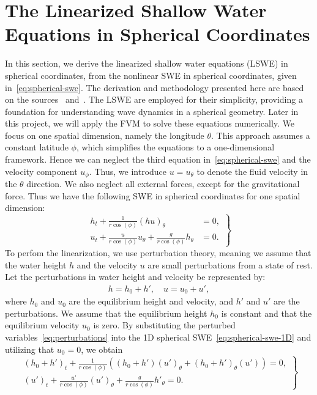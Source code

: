 \section{The Linearized Shallow Water Equations in Spherical Coordinates}
In this section, we derive the linearized shallow water equations (LSWE) in spherical coordinates, from the nonlinear SWE in spherical coordinates, given in~\eqref{eq:spherical-swe}.
The derivation and methodology presented here are based on the sources~\cite{BONEV_2018} and~\cite{Eskilsson_2005}.
The LSWE are employed for their simplicity, providing a foundation for understanding wave dynamics in a spherical geometry.
Later in this project, we will apply the FVM to solve these equations numerically.
We focus on one spatial dimension, namely the longitude $\theta$. 
This approach assumes a constant latitude $\phi$, which simplifies the equations to a one-dimensional framework.
Hence we can neglect the third equation in~\eqref{eq:spherical-swe} and the velocity component $u_\phi$.
Thus, we introduce $u = u_\theta$ to denote the fluid velocity in the $\theta$ direction.
We also neglect all external forces, except for the gravitational force.
Thus we have the following SWE in spherical coordinates for one spatial dimension:
\begin{equation}\label{eq:spherical-swe-1D}
    \left.
    \begin{aligned}
        h_t + \frac{1}{r \cos (\phi)}  {(h u)}_{\theta}  &= 0, \\
        {u}_t  + \frac{u}{r \cos (\phi)} {u}_\theta + \frac{g}{r \cos (\phi)} h_\theta  &= 0.
    \end{aligned}
    \right\}
\end{equation}
To perfom the linearization, we use perturbation theory, meaning we assume that the water height $h$ and the velocity $u$ are small perturbations from a state of rest.
Let the perturbations in water height and velocity be represented by:
\begin{align}\label{eq:perturbations}
    h = h_0 + h', \quad u = u_0 + u',
\end{align}
where $h_0$ and $u_0$ are the equilibrium height and velocity, and $h'$ and $u'$ are the perturbations.
We assume that the equilibrium height $h_0$ is constant and that the equilibrium velocity $u_0$ is zero.
By substituting the perturbed variables~\eqref{eq:perturbations} into the 1D spherical SWE~\eqref{eq:spherical-swe-1D} and utilizing that $u_0 = 0$, we obtain
\begin{equation}\label{eq:linearized_swe_spherical-perturbations}
    \left.
    \begin{aligned}
        {(h_0 + h')}_t + \frac{1}{r \cos (\phi)} \left( (h_0 + h'){(u')}_\theta  + {(h_0 + h')}_\theta(u') \right) = 0, \\
        {(u')}_t + \frac{u'}{r \cos (\phi)} {(u')}_\theta + \frac{g}{r \cos (\phi)} h'_\theta = 0.
    \end{aligned}
    \right\}
\end{equation}
